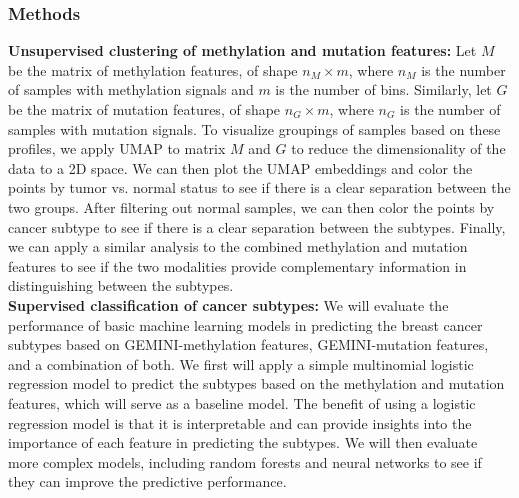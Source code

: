 \documentclass[11pt]{article}
\begin{document}
\subsubsection*{Methods}
\textbf{Unsupervised clustering of methylation and mutation features:}
Let $M$ be the matrix of methylation features, of shape $n_M \times m$, where $n_M$ is the number of samples with methylation signals and $m$ is the number of bins.
Similarly, let $G$ be the matrix of mutation features, of shape $n_G \times m$, where $n_G$ is the number of samples with mutation signals. 
To visualize groupings of samples based on these profiles,
we apply UMAP to matrix $M$ and $G$ to reduce the dimensionality of the data to a 2D space.
We can then plot the UMAP embeddings and color the points by tumor vs. normal status
to see if there is a clear separation between the two groups.
After filtering out normal samples, we can then color the points by cancer subtype to see if there is a clear separation between the subtypes.
Finally, we can apply a similar analysis to the combined methylation and mutation features to see if the two modalities provide complementary information in distinguishing between the subtypes.
\medskip \\
\textbf{Supervised classification of cancer subtypes:}
We will evaluate the performance of basic machine learning models in predicting the 
breast cancer subtypes based on GEMINI-methylation features, GEMINI-mutation features, and a combination of both. 
We first will apply a simple multinomial logistic regression model to predict the subtypes based on the methylation and mutation features, which will serve as a baseline model.
The benefit of using a logistic regression model is that it is interpretable and can provide insights into the importance of each feature in predicting the subtypes.
We will then evaluate more complex models, including random forests and neural networks to see if they can improve the predictive performance.
\end{document}
